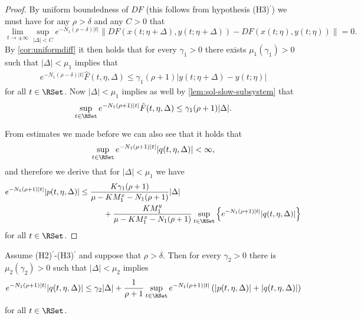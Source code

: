 \documentclass[a4paper]{siamart190516}
\begin{document}
\begin{proof}
By uniform boundedness of $DF$ (this follows from hypothesis (H3)$^\prime$) we must have for any $\rho > \delta$ and any $C>0$ that
 \[
 \lim_{t \rightarrow \pm \infty} \sup_{|\Delta| < C} e^{-N_1(\rho - \delta)|t|} \| DF(x(t;\eta+\Delta),y(t;\eta+\Delta)) - DF(x(t;\eta),y(t;\eta)) \| = 0.
 \]
 By \cref{cor:uniformdiff} it then holds that for every $\gamma_1 > 0$ there exists $\mu_1(\gamma_1)>0$ such that $|\Delta| < \mu_1$ implies that
    \begin{align*}
e^{ -N_1 (\rho-\delta)|t|} \hat{F}(t,\eta,\Delta) \leq \gamma_1 (\rho + 1) |y(t;\eta+\Delta)-y(t;\eta)|
  \end{align*}
  for all $t \in \RSet$. Now $|\Delta| < \mu_1$ implies as well by \cref{lem:sol-slow-subsystem} that
      \begin{align*}
\sup_{t \in \RSet} e^{ -N_1 (\rho+1)|t|} \hat{F}(t,\eta,\Delta) \leq \gamma_1 (\rho + 1) |\Delta|.
  \end{align*}
  
From estimates we made before we can also see that it holds that
\[
\sup_{t \in \RSet}  e^{ - N_1 (\rho +1)|t|} |q(t,\eta,\Delta)|  < \infty,
\]
and therefore we derive that for $|\Delta|<\mu_1$ we have
\begin{align*}
 e^{- N_1(\rho + 1) |t|} |p(t,\eta,\Delta)| &\leq \frac{K \gamma_1 (\rho+1)}{\mu-K M^x_1-N_1(\rho+1)} |\Delta| \\
 &\qquad \quad + \frac{K M^y_1}{\mu-K M^x_1-N_1(\rho+1)} \sup_{t \in \RSet} \left\{ e^{-N_1(\rho+1)|t|}|q(t,\eta,\Delta)| \right\}
\end{align*}
for all $t \in \RSet$.
\end{proof}

\begin{lemma}\label{lem:q-bound}
       Assume (H2)$^\prime$-(H3)$^\prime$ and suppose that $\rho > \delta$.  Then for every $\gamma_2 > 0$ there is $\mu_2(\gamma_2) > 0$ such that $|\Delta| < \mu_2$ implies
   \begin{align*}
    e^{ -N_1 (\rho +1)|t|} |q(t,\eta,\Delta)| \leq  \gamma_2 |\Delta| + \frac{1}{\rho+1} \sup_{t \in \RSet} e^{-N_1 (\rho +1)|t|}  \left( |p(t,\eta,\Delta)| +  |q(t, \eta, \Delta)| \right)
  \end{align*}
   for all $t \in \RSet$.
 \end{lemma}
\end{document}
